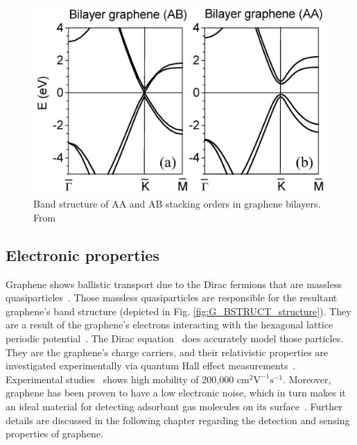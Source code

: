 \begin{figure}
    \centering
    \includegraphics[width=\textwidth]{Figs/AA_AB_bandStructure.png}
    \caption{Band structure of AA and AB stacking orders in graphene bilayers. From~\cite{Yakovkin2016}}
    \label{fig:G_BSTRUCT_structure_Stacking}
\end{figure}

%
\subsection{Electronic properties}
\label{graphene:electronic}
Graphene shows ballistic transport due to the Dirac fermions that are massless quasiparticles~\cite{Geim2007}. Those massless quasiparticles are responsible for the resultant graphene's band structure (depicted in Fig. \ref{fig:G_BSTRUCT_structure}). They are a result of the graphene's electrons interacting with the hexagonal lattice periodic potential~\cite{Geim2007}. The Dirac equation~\cite{Gusynin2005, Novoselov2005, Zhang2005, Geim2007} does accurately model those particles. They are the graphene's charge carriers, and their relativistic properties are investigated experimentally via quantum Hall effect measurements~\cite{Novoselov2004, Novoselov2005}. Experimental studies~\cite{Novoselov2004, Hwang2007, Bolotin2008, Morozov2008, Vincent2010, Rahimi2014, Banszeruse2015} shows high mobility of 200,000 $\textrm{cm}^2 \textrm{V}^{-1}\textrm{s}^{-1}$. Moreover, graphene has been proven to have a low electronic noise, which in turn makes it an ideal material for detecting adsorbant gas molecules on its surface~\cite{Schedin2007}. Further details are discussed in the following chapter regarding the detection and sensing properties of graphene.
%
